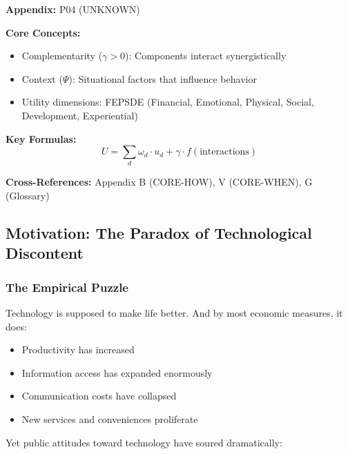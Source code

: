 \begin{tcolorbox}[colback=blue!5!white, colframe=blue!75!black,
    title=Quick Reference: Unknown]

\textbf{Appendix:} P04 (UNKNOWN)

\textbf{Core Concepts:}
\begin{itemize}[nosep]
\item Complementarity ($\gamma > 0$): Components interact synergistically
\item Context ($\Psi$): Situational factors that influence behavior
\item Utility dimensions: FEPSDE (Financial, Emotional, Physical, Social, Development, Experiential)
\end{itemize}

\textbf{Key Formulas:}
\begin{equation}
U = \sum_d \omega_d \cdot u_d + \gamma \cdot f(\text{interactions})
\end{equation}

\textbf{Cross-References:} Appendix B (CORE-HOW), V (CORE-WHEN), G (Glossary)
\end{tcolorbox}

\subsection{Motivation: The Paradox of Technological Discontent}

\subsubsection{The Empirical Puzzle}

Technology is supposed to make life better. And by most economic measures, it does:
\begin{itemize}
    \item Productivity has increased
    \item Information access has expanded enormously
    \item Communication costs have collapsed
    \item New services and conveniences proliferate
\end{itemize}

Yet public attitudes toward technology have soured dramatically:

